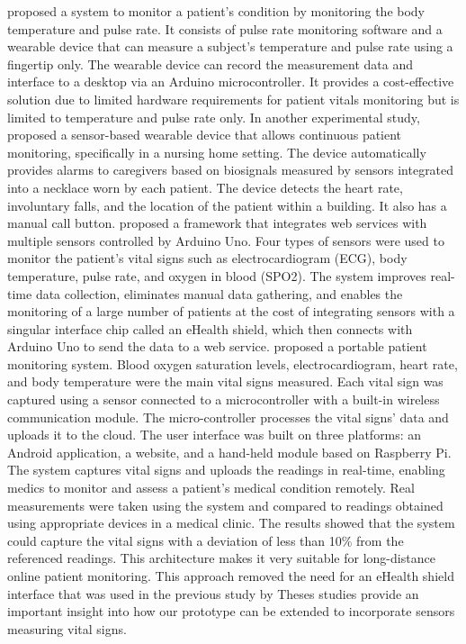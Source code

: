 \cite{DDPM} proposed a system to monitor a patient’s condition by monitoring the body temperature and pulse rate. It consists of pulse rate monitoring software and a wearable device that can measure a subject’s temperature and pulse rate using a fingertip only. The wearable device can record the measurement data and interface to a desktop via an Arduino microcontroller. It provides a cost-effective solution due to limited hardware requirements for patient vitals monitoring but is limited to temperature and pulse rate only. In another experimental study, \cite{necklace-sensor} proposed a sensor-based wearable device that allows continuous patient monitoring, specifically in a nursing home setting. The device automatically provides alarms to caregivers based on biosignals measured by sensors integrated into a necklace worn by each patient. The device detects the heart rate, involuntary falls, and the location of the patient within a building. It also has a manual call button. \cite{arduino-remote-monitoring} proposed a framework that integrates web services with multiple sensors controlled by Arduino Uno. Four types of sensors were used to monitor the patient's vital signs such as electrocardiogram (ECG), body temperature, pulse rate, and oxygen in blood (SPO2). The system improves real-time data collection, eliminates manual data gathering, and enables the monitoring of a large number of patients at the cost of integrating sensors with a singular interface chip called an eHealth shield, which then connects with Arduino Uno to send the data to a web service. \cite{jamjoum} proposed a portable patient monitoring system. Blood oxygen saturation levels, electrocardiogram, heart rate, and body temperature were the main vital signs measured. Each vital sign was captured using a sensor connected to a microcontroller with a built-in wireless communication module. The micro-controller processes the vital signs' data and uploads it to the cloud. The user interface was built on three platforms: an Android application, a website, and a hand-held module based on Raspberry Pi. The system captures vital signs and uploads the readings in real-time, enabling medics to monitor and assess a patient's medical condition remotely. Real measurements were taken using the system and compared to readings obtained using appropriate devices in a medical clinic. The results showed that the system could capture the vital signs with a deviation of less than 10\% from the referenced readings. This architecture makes it very suitable for long-distance online patient monitoring. This approach removed the need for an eHealth shield interface that was used in the previous study by Theses studies provide an important insight into how our prototype can be extended to incorporate sensors measuring vital signs.

